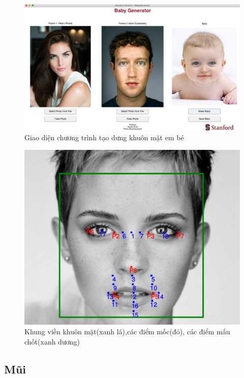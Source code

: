 \documentclass[journal]{IEEEtran}
\begin{document}
\begin{center}
    \begin{figure}[!t]
    \begin{center}
     \includegraphics[scale=1]{Images/11}
    \end{center}
    \caption{Giao diện chương trình tạo dưng khuôn mặt em bé}
    \label{refhinh2}
    \end{figure}
    \begin{figure}[!t]
    \begin{center}
     \includegraphics[scale=0.4]{Images/64}
    \end{center}
    \caption{Khung viền khuôn mặt(xanh lá),các điểm mốc(đỏ), các điểm mấu chốt(xanh dương)}
    \label{refhinh3}
    \end{figure}
\end{center}
\subsection{Mũi}
\end{document}
